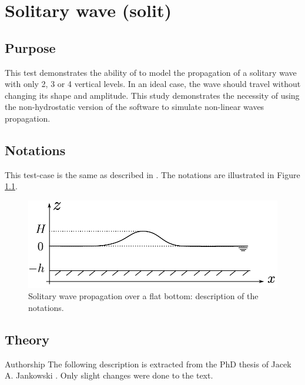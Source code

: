 \chapter{Solitary wave (solit)}
%
%

\section{Purpose}
%
This test demonstrates the ability of  to model the
propagation of a solitary wave with only 2, 3 or 4 vertical levels.
In an ideal case, the wave should travel without changing its shape and amplitude.
This study demonstrates the necessity of using the non-hydrostatic
version of the software to simulate non-linear waves propagation.
%
\section{Notations}

This test-case is the same as described in \cite{Jankowski1999}. The notations
are illustrated in Figure \ref{fig:solit_notations}.

\begin{figure}[H]
\begin{center}
  \includegraphics[scale=0.7]{img/figure1.pdf}
\end{center}
\caption{Solitary wave propagation over a flat bottom: description of the notations.}
\label{fig:solit_notations}
\end{figure}


\section{Theory}

\begin{WarningBlock}{Authorship}
The following description is extracted from the PhD thesis of Jacek A. Jankowski \cite{Jankowski1999}.
Only slight changes were done to the text.
\end{WarningBlock}

